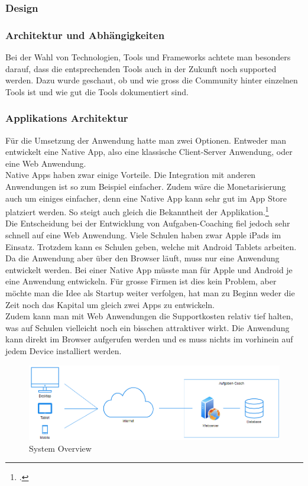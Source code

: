 \subsubsection{Design}
\subsubsection*{Architektur und Abhängigkeiten}
Bei der Wahl von Technologien, Tools und Frameworks achtete man besonders darauf, dass die entsprechenden Tools auch in der Zukunft noch supported werden. Dazu wurde geschaut, ob und wie gross die Community hinter einzelnen Tools ist und wie gut die Tools dokumentiert sind.

\subsubsection*{Applikations Architektur}
Für die Umsetzung der Anwendung hatte man zwei Optionen. Entweder man entwickelt eine Native App, also eine klassische Client-Server Anwendung, oder eine Web Anwendung. \\

Native Apps haben zwar einige Vorteile. Die Integration mit anderen Anwendungen ist so zum Beispiel einfacher. Zudem wäre die Monetarisierung auch um einiges einfacher, denn eine Native App kann sehr gut im App Store platziert werden. So steigt auch gleich die Bekanntheit der Applikation.\footcite{native_app} \\

Die Entscheidung bei der Entwicklung von Aufgaben-Coaching fiel jedoch sehr schnell auf eine Web Anwendung. Viele Schulen haben zwar Apple iPads im Einsatz. Trotzdem kann es Schulen geben, welche mit Android Tablets arbeiten. Da die Anwendung aber über den Browser läuft, muss nur eine Anwendung entwickelt werden. Bei einer Native App müsste man für Apple und Android je eine Anwendung entwickeln. Für grosse Firmen ist dies kein Problem, aber möchte man die Idee als Startup weiter verfolgen, hat man zu Beginn weder die Zeit noch das Kapital um gleich zwei Apps zu entwickeln. \\
Zudem kann man mit Web Anwendungen die Supportkosten relativ tief halten, was auf Schulen vielleicht noch ein bisschen attraktiver wirkt. Die Anwendung kann direkt im Browser aufgerufen werden und es muss nichts im vorhinein auf jedem Device installiert werden.

\begin{figure}[H]
\begin{center}
	\includegraphics[width=\textwidth, keepaspectratio]{images/system_overview.png}
	\caption{System Overview}
	\label{fig:system_overview}
\end{center}
\end{figure}



